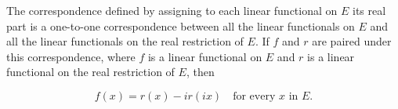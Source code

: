 The correspondence defined by assigning to each linear functional on $E$ its real part is a one-to-one correspondence between all the linear functionals on $E$ and all the linear functionals on the real restriction of $E$. If $f$ and $r$ are paired under this correspondence, where $f$ is a linear functional on $E$ and $r$ is a linear functional on the real restriction of $E$, then

$$f(x) = r(x) - i r(ix) \quad \text{for every } x \text{ in } E.$$
